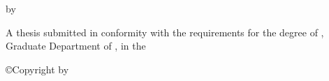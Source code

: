 
\begin{titlepage}
  \thispagestyle{empty}

  {
    \huge
    \noindent
    \color{colourTitle}    
    \textsc{\thesisTitle{}}\par
  }

  {
    \vspace{1.5in}

    \small
    \noindent
    by\par
  }

  {
    \vspace{1.5in}

    \large
    \noindent
    \candidateName{}\par
  }
  {
    \vspace{2in}

    \small
    \noindent
    A thesis submitted in conformity with the requirements for the degree of \degreeName{},
    Graduate Department of \departmentName{}, in the \universityName{}\par
  }

  {
    \vfill

    \footnotesize
    \noindent
    \copyright Copyright \graduationYear{} by \candidateName{}
  }
\end{titlepage}

\restoregeometry